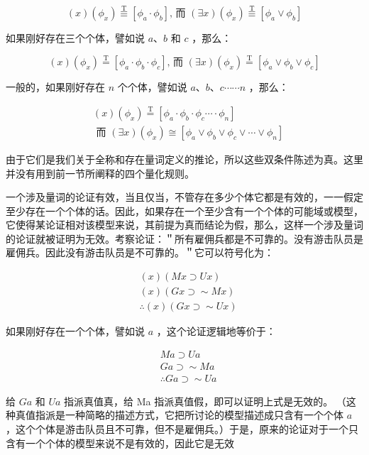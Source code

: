 $$
(x)\left(\phi_{x}\right) \stackrel{\mathrm{T}}{\equiv}\left[\phi_{a} \cdot \phi_{b}\right] \text {, 而 }(\exists x)\left(\phi_{x}\right) \stackrel{\mathrm{T}}{\equiv}\left[\phi_{a} \vee \phi_{b}\right]
$$

如果刚好存在三个个体，譬如说 $a 、 b$ 和 $c$ ，那么：

$$
(x)\left(\phi_{x}\right) \stackrel{\mathrm{T}}{=}\left[\phi_{a} \cdot \phi_{b} \cdot \phi_{c}\right] \text {, 而 }(\exists x)\left(\phi_{x}\right) \stackrel{\mathrm{T}}{=}\left[\phi_{a} \vee \phi_{b} \vee \phi_{c}\right]
$$

一般的，如果刚好存在 $n$ 个个体，譬如说 $a 、 b 、 c \cdots \cdots n$ ，那么：

$$
\begin{aligned}
& (x)\left(\phi_{x}\right) \stackrel{\mathrm{T}}{=}\left[\phi_{a} \cdot \phi_{b} \cdot \phi_{c} \cdots \cdot \phi_{n}\right] \\
& \text { 而 }(\exists x)\left(\phi_{x}\right) \cong\left[\phi_{a} \vee \phi_{b} \vee \phi_{c} \vee \cdots \vee \phi_{n}\right]
\end{aligned}
$$

由于它们是我们关于全称和存在量词定义的推论，所以这些双条件陈述为真。这里并没有用到前一节所阐释的四个量化规则。

一个涉及量词的论证有效，当且仅当，不管存在多少个体它都是有效的，一一假定至少存在一个个体的话。因此，如果存在一个至少含有一个个体的可能域或模型，它使得某论证相对该模型来说，其前提为真而结论为假，那么，这样一个涉及量词的论证就被证明为无效。考察论证：＂所有雇佣兵都是不可靠的。没有游击队员是雇佣兵。因此没有游击队员是不可靠的。＂它可以符号化为：

$$
\begin{aligned}
& (x)(M x \supset U x) \\
& (x)(G x \supset \sim M x) \\
& \therefore(x)(G x \supset \sim U x)
\end{aligned}
$$

如果刚好存在一个个体，譬如说 $a$ ，这个论证逻辑地等价于：

$$
\begin{aligned}
& M a \supset U a \\
& G a \supset \sim M a \\
& \therefore G a \supset \sim U a
\end{aligned}
$$

给 $G a$ 和 $U a$ 指派真值真，给 Ma 指派真值假，即可以证明上式是无效的。 （这种真值指派是一种简略的描述方式，它把所讨论的模型描述成只含有一个个体 $a$ ，这个个体是游击队员且不可靠，但不是雇佣兵。）于是，原来的论证对于一个只含有一个个体的模型来说不是有效的，因此它是无效

